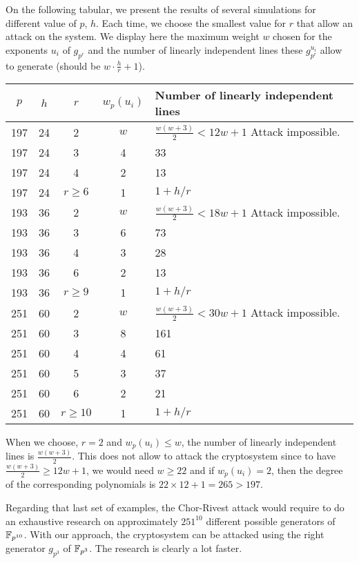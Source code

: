 \documentclass[12pt,a4paper,titlepage]{article}
\begin{document}
On the following tabular, we present the results of several simulations for different value of $p$, $h$. Each time, we choose the smallest value for $r$ that allow an attack on the system. We display here the maximum weight $w$ chosen for the exponents $u_i$ of $g_{p^r}$ and the number of linearly independent lines these $g_{p^r}^{u_i}$ allow to generate (should be $w\cdot \frac{h}{r} +1$).


\begin{tabular}{|c|c|c|c|l|}
\hline
$p$ & $h$ & $r$ & $w_p(u_i)$ & Number of linearly independent lines  \\
\hline
197 & 24 & 2 & $w$ & $\frac{w(w+3)}{2} < 12w+1$ Attack impossible. \\
\hline
197 & 24 & 3 & 4 & 33\\
\hline
197 & 24 & 4 & 2 & 13\\
\hline
197 & 24 & $r \geq 6$ & 1 & $1 + h/r$ \\
\hline
193 & 36 & 2 & $w$ & $\frac{w(w+3)}{2} < 18w+1$ Attack impossible. \\
\hline
193 & 36 & 3 & 6 & 73\\
\hline
193 & 36 & 4 & 3 & 28\\
\hline
193 & 36 & 6 & 2 & 13\\
\hline
193 & 36 & $r \geq 9$ & 1 & $1 + h/r$ \\
\hline
251 & 60 & 2 & $w$ & $\frac{w(w+3)}{2} < 30w+1$ Attack impossible. \\
\hline
251 & 60 & 3 & 8 & 161\\
\hline
251 & 60 & 4 & 4 & 61\\
\hline
251 & 60 & 5 & 3 & 37\\
\hline
251 & 60 & 6 & 2 & 21\\
\hline
251 & 60 & $r \geq 10$ & 1 & $1 + h/r$ \\
\hline
\end{tabular}

When we choose, $r = 2$ and $w_p(u_i) \leq w$, the number of linearly independent lines is $\frac{w(w+3)}{2}$. This does not allow to attack the cryptosystem since to have $\frac{w(w+3)}{2} \geq 12w+1$, we would need $w \geq 22$ and if $w_p(u_i) = 2$, then the degree of the corresponding polynomials is $22 \times 12+1 = 265 > 197$.

Regarding that last set of examples, the Chor-Rivest attack would require to do an exhaustive research on approximately $251^{10}$ different possible generators of $\mathbb{F}_{p^{10}}$. With our approach, the cryptosystem can be attacked using the right generator $g_{p^3}$ of $\mathbb{F}_{p^3}$. The research is clearly a lot faster.
\end{document}
